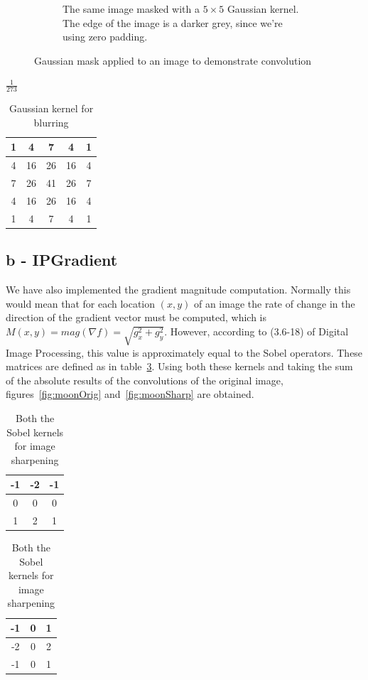 \begin{figure}[!htb]
\begin{subfigure}[b]{0.49\linewidth}
  \caption{The same image masked with a \(5\times5\) Gaussian kernel. The edge of the image is a darker grey, since we're using zero padding.}
  \label{fig:blur}
 \end{subfigure}
 \caption{Gaussian mask applied to an image to demonstrate convolution}
\end{figure}
\begin{table}[!htb]
\begin{center}
$\frac{1}{273}$
\begin{tabular}{|c|c|c|c|c|}\hline
1 & 4 & 7 & 4 & 1\\ \hline
4 &  16 &  26 &  16 &  4 \\ \hline
7 &  26 &  41 &  26 &  7\\ \hline
4 &  16 &  26 &  16 &  4\\ \hline
1 &  4 &  7 &  4 &  1 \\ \hline
\end{tabular}

\caption{Gaussian kernel for blurring}
\label{tbl:gauss}
\end{center}
\end{table}

\subsection*{b - IPGradient}
We have also implemented the gradient magnitude computation. Normally this would mean that for each location $(x, y)$ of an image the rate of change in the direction of the gradient vector must be computed, which is $M(x, y) = mag(\nabla f) = \sqrt{g_x ^2 + g_y ^2}$. However, according to (3.6-18) of Digital Image Processing\cite[p.~189]{gonzalez2002digital}, this value is approximately equal to the Sobel operators. These matrices are defined as in table~\ref{tbl:sobel}. Using both these kernels and taking the sum of the absolute results of the convolutions of the original image, figures~\ref{fig:moonOrig} and~\ref{fig:moonSharp} are obtained. 
\begin{table}[!htb]
\begin{center}
\begin{tabular}{|c|c|c|}\hline
-1 & -2 & -1 \\ \hline
0 & 0 & 0 \\ \hline
1 & 2 & 1 \\ \hline
\end{tabular}
\begin{tabular}{|c|c|c|}\hline
-1 & 0 & 1 \\ \hline
-2 & 0 & 2 \\ \hline
-1 & 0 & 1 \\ \hline
\end{tabular}

\caption{Both the Sobel kernels for image sharpening}
\label{tbl:sobel}
\end{center}
\end{table}

